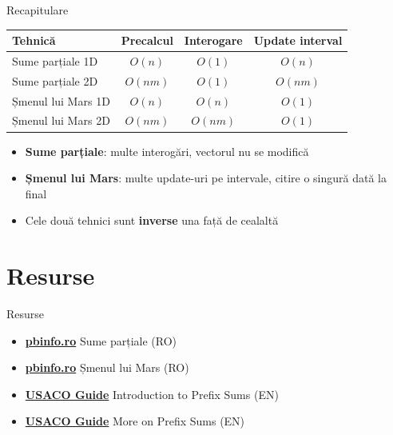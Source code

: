 ﻿\documentclass{beamer}
\begin{document}
\begin{frame}{Recapitulare}
  \begin{center}
  \begin{tabular}{lccc}
    \toprule
    Tehnică & Precalcul & Interogare & Update interval \\
    \midrule
    Sume parțiale 1D   & $O(n)$    & $O(1)$    & $O(n)$ \\
    Sume parțiale 2D   & $O(nm)$   & $O(1)$    & $O(nm)$ \\
    Șmenul lui Mars 1D & $O(n)$    & $O(n)$    & $O(1)$ \\
    Șmenul lui Mars 2D & $O(nm)$   & $O(nm)$   & $O(1)$ \\
    \bottomrule
  \end{tabular}
  \end{center}

  \smallskip
  \begin{itemize}
    \item \textbf{Sume parțiale}: multe interogări, vectorul nu se modifică
    \item \textbf{Șmenul lui Mars}: multe update-uri pe intervale, citire o singură dată la final
    \item Cele două tehnici sunt \textbf{inverse} una față de cealaltă
  \end{itemize}
\end{frame}

\section{Resurse}

\begin{frame}{Resurse}
  \begin{itemize}\itemsep6pt
    \item \href{https://www.pbinfo.ro}{\textbf{pbinfo.ro}} \textemdash{} Sume parțiale (RO)
    \item \href{https://www.pbinfo.ro}{\textbf{pbinfo.ro}} \textemdash{} Șmenul lui Mars (RO)
    \item \href{https://usaco.guide/silver/prefix-sums?lang=cpp}{\textbf{USACO Guide}} \textemdash{} Introduction to Prefix Sums (EN)
    \item \href{https://usaco.guide/silver/more-prefix-sums?lang=cpp}{\textbf{USACO Guide}} \textemdash{} More on Prefix Sums (EN)
  \end{itemize}
\end{frame}
\end{document}
